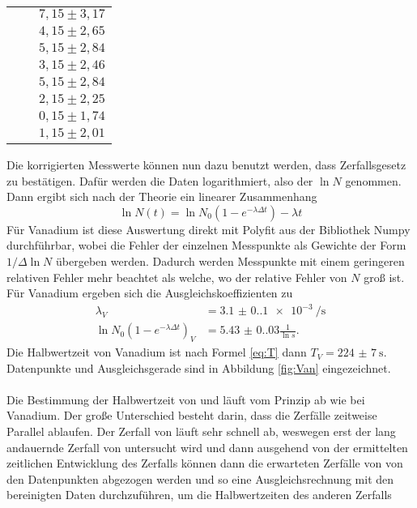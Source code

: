 \begin{table}[H]
\begin{tabular}{c c c}
      &  & $7,15 \pm 3,17$ \\
      &  & $4,15 \pm 2,65$ \\
      &  & $5,15 \pm 2,84$ \\
      &  & $3,15 \pm 2,46$ \\
      &  & $5,15 \pm 2,84$ \\
      &  & $2,15 \pm 2,25$ \\
      &  & $0,15 \pm 1,74$ \\
      &  & $1,15 \pm 2,01$ \\
      \bottomrule
  \end{tabular}
\end{table}

\noindent Die korrigierten Messwerte können nun dazu benutzt werden, dass Zerfallsgesetz zu bestätigen.
Dafür werden die Daten logarithmiert, also der $\ln{N}$ genommen. Dann ergibt sich
nach der Theorie ein linearer Zusammenhang
\begin{equation}
    \ln{N(t)}=\ln{N_0(1-e^{-\lambda \Delta t})}-\lambda t
    \label{eq:linN}
\end{equation}
Für Vanadium ist diese Auswertung direkt mit Polyfit aus der Bibliothek Numpy \cite{numpy}
durchführbar, wobei die Fehler der einzelnen Messpunkte als Gewichte der Form $1/\Delta \ln{N}$ übergeben werden. Dadurch werden 
Messpunkte mit einem geringeren relativen Fehler mehr beachtet als welche, wo der relative Fehler von $N$ groß ist.
Für Vanadium ergeben sich die Ausgleichskoeffizienten zu
\begin{align*}
  \lambda_V&=\qty{3.1(0.1)e-3}{\per\s}\\
  \ln{N_0(1-e^{-\lambda \Delta t})}_V&=\num{5.43(0.03)}\frac{1}{\ln{s}}.
\end{align*}
Die Halbwertzeit von Vanadium ist nach Formel \eqref{eq:T} dann $T_V=\qty{224(7)}{\second}$.
Datenpunkte und Ausgleichsgerade sind in Abbildung \ref{fig:Van} eingezeichnet.\\
\\
\noindent Die Bestimmung der Halbwertzeit von  und  läuft vom Prinzip
ab wie bei Vanadium. Der große Unterschied besteht darin, dass die Zerfälle zeitweise Parallel ablaufen.
Der Zerfall von  läuft sehr schnell ab, weswegen erst der lang andauernde Zerfall von 
untersucht wird und dann ausgehend von der ermittelten zeitlichen Entwicklung
des Zerfalls können dann die erwarteten Zerfälle von  von den Datenpunkten
abgezogen werden und so eine Ausgleichsrechnung mit den bereinigten Daten durchzuführen, um die Halbwertzeiten des anderen Zerfalls 

